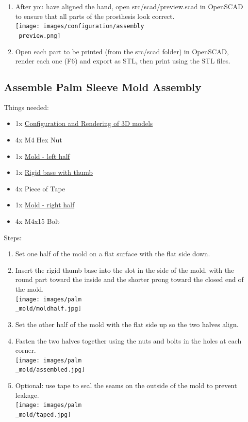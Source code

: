 \documentclass[11pt]{article}
\begin{document}
\begin{enumerate}
\item After you have aligned the hand, open src/scad/preview.scad in OpenSCAD to ensure that all parts of the prosthesis look correct.\\ \texttt{[image: images/configuration/assembly\\\_preview.png]}
\item Open each part to be printed (from the src/scad folder) in OpenSCAD, render each one (F6) and export as STL, then print using the STL files.
\end{enumerate}

\subsection{Assemble Palm Sleeve Mold Assembly}
Things needed:
\begin{itemize}
\item 1x \hyperlink{thing_config\_file}{Configuration and Rendering of 3D models}
\item 4x M4 Hex Nut
\item 1x \hyperlink{thing_mold\_left\_half}{Mold - left half}
\item 1x \hyperlink{thing_rigid\_base}{Rigid base with thumb}
\item 4x Piece of Tape
\item 1x \hyperlink{thing_mold\_right\_half}{Mold - right half}
\item 4x M4x15 Bolt
\end{itemize}
Steps:
\begin{enumerate}
\item Set one half of the mold on a flat surface with the flat side down.
\item Insert the rigid thumb base into the slot in the side of the mold, with the round part toward the inside and the shorter prong toward the closed end of the mold.\\ \texttt{[image: images/palm\\\_mold/moldhalf.jpg]}
\item Set the other half of the mold with the flat side up so the two halves align.
\item Fasten the two halves together using the nuts and bolts in the holes at each corner.\\ \texttt{[image: images/palm\\\_mold/assembled.jpg]}
\item Optional: use tape to seal the seams on the outside of the mold to prevent leakage.\\ \texttt{[image: images/palm\\\_mold/taped.jpg]}
\end{enumerate}
\end{document}
